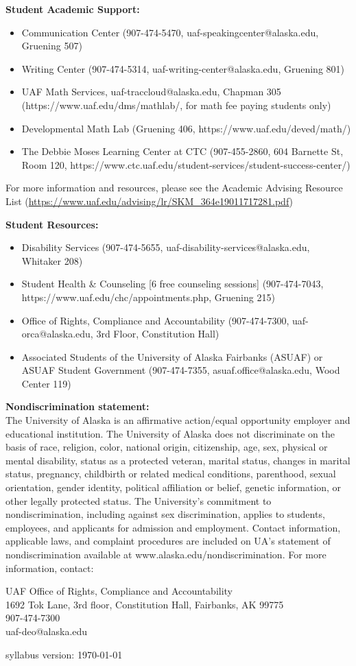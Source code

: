 \documentclass[12pt]{article}
\renewcommand{\emph}[1]{\textsf{\textbf{#1}}}
\newcommand{\localhead}[1]{\par\smallskip\textbf{#1}\nobreak\\}%
\def\subheading#1{\localhead{\emph{#1}}}
\begin{document}
\subheading{Student Academic Support:}
\begin{itemize}
\item Communication Center (907-474-5470, uaf-speakingcenter@alaska.edu, Gruening 507)
\item Writing Center (907-474-5314, uaf-writing-center@alaska.edu, Gruening 801)
\item UAF Math Services, uaf-traccloud@alaska.edu, Chapman 305 (https://www.uaf.edu/dms/mathlab/, for math fee paying students only)
\item Developmental Math Lab (Gruening 406, https://www.uaf.edu/deved/math/)
\item The Debbie Moses Learning Center at CTC (907-455-2860, 604 Barnette St, Room 120, https://www.ctc.uaf.edu/student-services/student-success-center/)
\end{itemize}
For more information and resources, please see the Academic Advising Resource List (\url{https://www.uaf.edu/advising/lr/SKM_364e19011717281.pdf})


\subheading{Student Resources:}
\begin{itemize}
\item Disability Services (907-474-5655, uaf-disability-services@alaska.edu, Whitaker 208) 
\item Student Health \& Counseling [6 free counseling sessions] (907-474-7043, https://www.uaf.edu/chc/appointments.php, Gruening 215)
\item Office of Rights, Compliance and Accountability (907-474-7300, uaf-orca@alaska.edu, 3rd Floor, Constitution Hall)
\item Associated Students of the University of Alaska Fairbanks (ASUAF) or ASUAF Student Government (907-474-7355, asuaf.office@alaska.edu, Wood Center 119)
\end{itemize}


\subheading{Nondiscrimination statement:} The University of Alaska is an affirmative action/equal opportunity employer and educational institution. The University of Alaska does not discriminate on the basis of race, religion, color, national origin, citizenship, age, sex, physical or mental disability, status as a protected veteran, marital status, changes in marital status, pregnancy, childbirth or related medical conditions, parenthood, sexual orientation, gender identity, political affiliation or belief, genetic information, or other legally protected status. The University's commitment to nondiscrimination, including against sex discrimination, applies to students, employees, and applicants for admission and employment. Contact information, applicable laws, and complaint procedures are included on UA's statement of nondiscrimination available at www.alaska.edu/nondiscrimination. For more information, contact: 

UAF Office of Rights, Compliance and Accountability\\
1692 Tok Lane, 3rd floor, Constitution Hall, Fairbanks, AK  99775\\
907-474-7300\\
uaf-deo@alaska.edu\\

\hfill

 \scriptsize syllabus version: \today \normalsize
\end{document}
